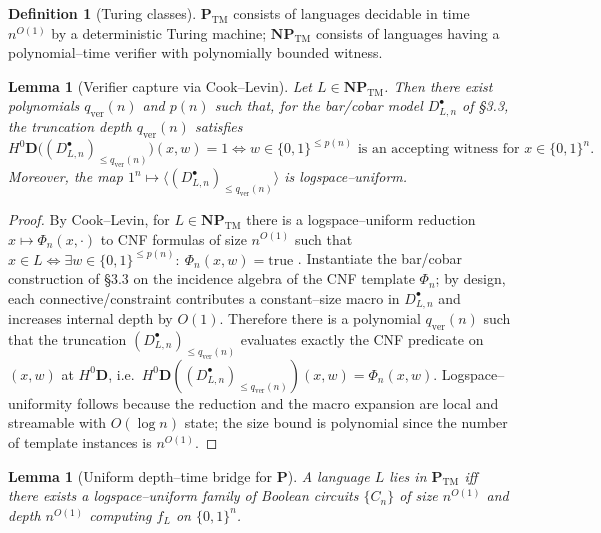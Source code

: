 \documentclass[12pt]{article}
\theoremstyle{plain}
\newtheorem{lemma}[theorem]{Lemma}
\theoremstyle{definition}
\newtheorem{definition}[theorem]{Definition}
\theoremstyle{remark}
\numberwithin{equation}{section}
\begin{document}
\begin{definition}[Turing classes]
\(\mathbf P_{\mathrm{TM}}\) consists of languages decidable in time \(n^{O(1)}\) by a deterministic Turing machine; \(\mathbf{NP}_{\mathrm{TM}}\) consists of languages having a polynomial–time verifier with polynomially bounded witness.
\end{definition}

\begin{lemma}[Verifier capture via Cook--Levin]\label{lem:verifier-capture}
Let $L\in \mathbf{NP}_{\mathrm{TM}}$. Then there exist polynomials $q_{\mathrm{ver}}(n)$ and $p(n)$ such that, for the bar/cobar model $D_{L,n}^{\bullet}$ of §3.3, the truncation depth $q_{\mathrm{ver}}(n)$ satisfies
\[
H^{0}\mathbf D\!\big((D_{L,n}^{\bullet})_{\le q_{\mathrm{ver}}(n)}\big)(x,w)=1
\iff
\text{$w\in\{0,1\}^{\le p(n)}$ is an accepting witness for $x\in\{0,1\}^n$}.
\]
Moreover, the map $1^n\mapsto \langle (D_{L,n}^{\bullet})_{\le q_{\mathrm{ver}}(n)}\rangle$ is logspace–uniform.
\end{lemma}

\begin{proof}
By Cook--Levin, for $L\in \mathbf{NP}_{\mathrm{TM}}$ there is a logspace–uniform reduction $x\mapsto \Phi_n(x,\cdot)$ to CNF formulas of size $n^{O(1)}$ such that
$x\in L \iff \exists w\in\{0,1\}^{\le p(n)}:\ \Phi_n(x,w)=\mathrm{true}$
\cite{Sipser2013,AroraBarak2009,Cook1971,Levin1973,Karp1972}.
Instantiate the bar/cobar construction of §3.3 on the incidence algebra of the CNF template $\Phi_n$; by design, each connective/constraint contributes a constant–size macro in $D_{L,n}^{\bullet}$ and increases internal depth by $O(1)$. Therefore there is a polynomial $q_{\mathrm{ver}}(n)$ such that the truncation $(D_{L,n}^{\bullet})_{\le q_{\mathrm{ver}}(n)}$ evaluates exactly the CNF predicate on $(x,w)$ at $H^{0}\mathbf D$, i.e.\
\(
H^{0}\mathbf D((D_{L,n}^{\bullet})_{\le q_{\mathrm{ver}}(n)})(x,w)=\Phi_n(x,w).
\)
Logspace–uniformity follows because the reduction and the macro expansion are local and streamable with $O(\log n)$ state; the size bound is polynomial since the number of template instances is $n^{O(1)}$.
\end{proof}

\begin{lemma}[Uniform depth–time bridge for \(\mathbf P\)]\label{lem:PTM-circuits}
A language \(L\) lies in \(\mathbf P_{\mathrm{TM}}\) iff there exists a logspace–uniform family of Boolean circuits \(\{C_n\}\) of size \(n^{O(1)}\) and depth \(n^{O(1)}\) computing \(f_{L}\) on \(\{0,1\}^{n}\).
\end{lemma}
\end{document}
